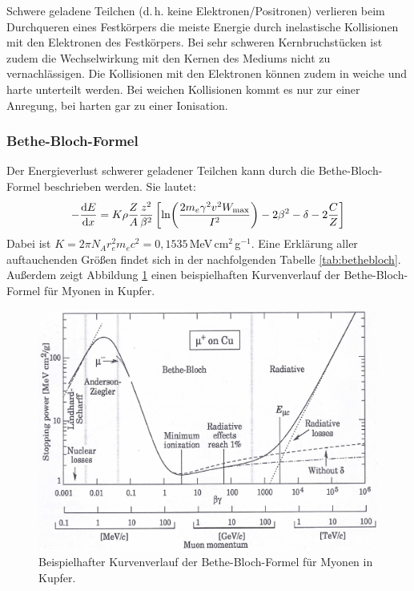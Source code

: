 Schwere geladene Teilchen (d.\,h. keine Elektronen/Positronen) verlieren beim Durchqueren eines Festkörpers die meiste Energie durch inelastische Kollisionen mit den Elektronen des Festkörpers. Bei sehr schweren Kernbruchstücken ist zudem die Wechselwirkung mit den Kernen des Mediums nicht zu vernachlässigen. Die Kollisionen mit den Elektronen können zudem in weiche und harte unterteilt werden. Bei weichen Kollisionen kommt es nur zur einer Anregung, bei harten gar zu einer Ionisation. 

\subsubsection{Bethe-Bloch-Formel}

Der Energieverlust schwerer geladener Teilchen kann durch die Bethe-Bloch-Formel beschrieben werden. Sie lautet:
\begin{align}
	-\derivative{E}{x}=K\rho \frac{Z}{A}\frac{z^2}{\beta^2}\left[ \ln(\frac{2m_e\gamma^2v^2W_\text{max}}{I^2})-2\beta^2-\delta -2\frac{C}{Z}\right] 
\end{align}
Dabei ist $K=2\pi N_A r_e^2m_ec^2=0,1535\,$MeV\,cm$^2$\,g$^{-1}$. Eine Erklärung aller auftauchenden Größen findet sich in der nachfolgenden Tabelle \ref{tab:bethebloch}. Außerdem zeigt Abbildung \ref{bethebloch} einen beispielhaften Kurvenverlauf der Bethe-Bloch-Formel für Myonen in Kupfer.

\begin{figure}[h]
	\centering
	\includegraphics[width=\textwidth]{img/BetheBloch}
	\caption{Beispielhafter Kurvenverlauf der Bethe-Bloch-Formel für Myonen in Kupfer. \cite{bethebloch}}
	\label{bethebloch}
\end{figure}

